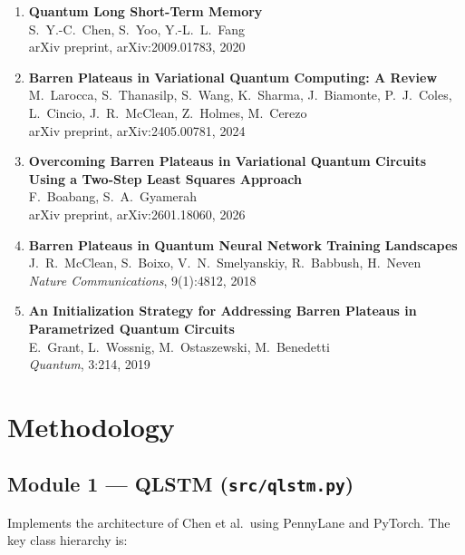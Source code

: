 \documentclass[10pt,twocolumn]{article}
\begin{document}
\begin{enumerate}

\item \textbf{Quantum Long Short-Term Memory}\\
S.\ Y.-C.\ Chen, S.\ Yoo, Y.-L.\ L.\ Fang\\
arXiv preprint, arXiv:2009.01783, 2020

\item \textbf{Barren Plateaus in Variational Quantum Computing: A Review}\\
M.\ Larocca, S.\ Thanasilp, S.\ Wang, K.\ Sharma, J.\ Biamonte, P.\ J.\ Coles,
L.\ Cincio, J.\ R.\ McClean, Z.\ Holmes, M.\ Cerezo\\
arXiv preprint, arXiv:2405.00781, 2024

\item \textbf{Overcoming Barren Plateaus in Variational Quantum Circuits Using a Two-Step Least Squares Approach}\\
F.\ Boabang, S.\ A.\ Gyamerah\\
arXiv preprint, arXiv:2601.18060, 2026

\item \textbf{Barren Plateaus in Quantum Neural Network Training Landscapes}\\
J.\ R.\ McClean, S.\ Boixo, V.\ N.\ Smelyanskiy, R.\ Babbush, H.\ Neven\\
\textit{Nature Communications}, 9(1):4812, 2018

\item \textbf{An Initialization Strategy for Addressing Barren Plateaus in Parametrized Quantum Circuits}\\
E.\ Grant, L.\ Wossnig, M.\ Ostaszewski, M.\ Benedetti\\
\textit{Quantum}, 3:214, 2019

\end{enumerate}


\section{Methodology}

\subsection*{Module 1 — QLSTM (\texttt{src/qlstm.py})}

Implements the architecture of Chen et al.\ using PennyLane and PyTorch. The key class hierarchy is:
\end{document}
